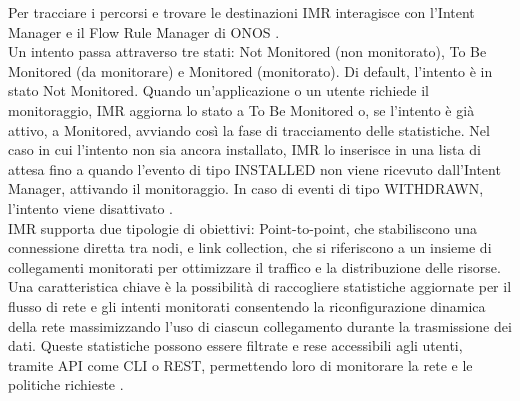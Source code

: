 Per tracciare i percorsi e trovare le destinazioni IMR interagisce con l'Intent Manager e il Flow Rule Manager di ONOS \cite{onosint}. 
\\Un intento passa attraverso tre stati: Not Monitored (non monitorato), To Be Monitored (da monitorare) e Monitored (monitorato). 
Di default, l'intento è in stato Not Monitored. Quando un'applicazione o un utente richiede il monitoraggio, IMR aggiorna lo stato a To Be Monitored o, se l'intento è già attivo, a Monitored, avviando così la fase di tracciamento delle statistiche.
Nel caso in cui l'intento non sia ancora installato, IMR lo inserisce in una lista di attesa fino a quando l'evento di tipo INSTALLED non viene ricevuto dall'Intent Manager, attivando il monitoraggio.
In caso di eventi di tipo WITHDRAWN, l'intento viene disattivato \cite{onosint}.
\\IMR supporta due tipologie di obiettivi: Point-to-point, che stabiliscono una connessione diretta tra nodi, e 
link collection, che si riferiscono a un insieme di collegamenti monitorati per ottimizzare il traffico e la distribuzione delle risorse.
\\Una caratteristica chiave è la possibilità di raccogliere statistiche aggiornate per il flusso di rete e gli intenti monitorati 
consentendo la riconfigurazione dinamica della rete massimizzando l'uso di ciascun collegamento durante la trasmissione dei dati.
Queste statistiche possono essere filtrate e rese accessibili agli utenti, tramite API come CLI o REST, permettendo loro di monitorare la rete e le politiche richieste \cite{ONOSart}. 

